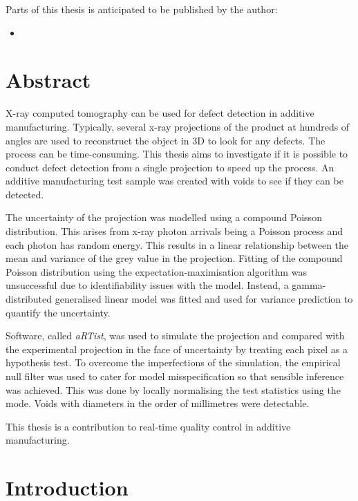 \documentclass[12pt, a4paper, oneside]{memoir}
\begin{document}
Parts of this thesis is anticipated to be published by the author:
\begin{itemize}
  \item\nobibliography*{}
\end{itemize}

\chapter{Abstract}
X-ray computed tomography can be used for defect detection in additive manufacturing. Typically, several x-ray projections of the product at hundreds of angles are used to reconstruct the object in 3D to look for any defects. The process can be time-consuming. This thesis aims to investigate if it is possible to conduct defect detection from a single projection to speed up the process. An additive manufacturing test sample was created with voids to see if they can be detected.

The uncertainty of the projection was modelled using a compound Poisson distribution. This arises from x-ray photon arrivals being a Poisson process and each photon has random energy. This results in a linear relationship between the mean and variance of the grey value in the projection. Fitting of the compound Poisson distribution using the expectation-maximisation algorithm was unsuccessful due to identifiability issues with the model. Instead, a gamma-distributed generalised linear model was fitted and used for variance prediction to quantify the uncertainty.

Software, called \emph{aRTist}, was used to simulate the projection and compared with the experimental projection in the face of uncertainty by treating each pixel as a hypothesis test. To overcome the imperfections of the simulation, the empirical null filter was used to cater for model misspecification so that sensible inference was achieved. This was done by locally normalising the test statistics using the mode. Voids with diameters in the order of millimetres were detectable.

This thesis is a contribution to real-time quality control in additive manufacturing.

\newpage

\mainmatter

\chapter{Introduction}
\end{document}
